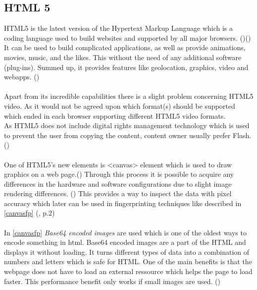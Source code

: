 \subsection{HTML 5}\label{html5}
HTML5 is the latest version of the Hypertext Markup Language which is a coding language used to build websites and supported by all major browsers. (\textcite{pixel18})(\textcite{marshall17}) It can be used to build complicated applications, as well as provide animations, movies, music, and the likes. This without the need of any additional software (plug-ins). Summed up, it provides features like geolocation, graphics, video and webapps. (\textcite{marshall17})\\\\
Apart from its incredible capabilities there is a slight problem concerning HTML5 video. As it would not be agreed upon which format(s) should be supported which ended in each browser supporting different HTML5 video formats.\\
As HTML5 does not include digital rights management technology which is used to prevent the user from copying the content, content owner usually prefer Flash. (\textcite{marshall17})\\\\
One of HTML5's new elements is <canvas> element which is used to draw graphics on a web page.(\textcite{pixel18}) Through this process it is possible to acquire any differences in the hardware and software configurations due to slight image rendering differences. (\textcite{amiunique}) This provides a way to inspect the data with pixel accuracy which later can be used in fingerprinting techniques like described in \autoref{canvasfp} (\textcite{mowery12}, p.2) \\\\
In \autoref{canvasfp} \textit{Base64 encoded images} are used which is one of the oldest ways to encode something in html. Base64 encoded images are a part of the HTML and displays it without loading. It turns different types of data into a combination of numbers and letters which is safe for HTML. One of the main benefits is that the webpage does not have to load an external ressource which helps the page to load faster. This performance benefit only works if small images are used. (\textcite{sexton15})

